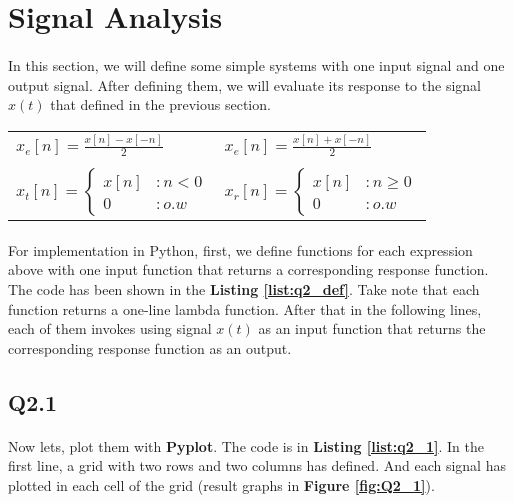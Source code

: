 \section{Signal Analysis}
\paragraph{}In this section, we will define some 
simple systems with one input signal and one output 
signal. After defining them, we will evaluate its 
response to the signal $x(t)$ that defined in the
 previous section.
 \begin{center}
\begin{tabular}{ p{5cm} p{5cm} }
 $x_e[n]=\frac{x[n]-x[-n]}{2}$ & $x_e[n]=\frac{x[n]+x[-n]}{2}$  \\ 
  & \\
 $
  x_t[n] = \begin{cases}
   x[n] &: n < 0\\
   0 &: o.w\end{cases}
 $ & $
  x_r[n] = \begin{cases}
   x[n] &: n\geq 0\\
   0 &: o.w\end{cases}
 $  \\  
 
\end{tabular}
\end{center}
\paragraph{}For implementation in Python, first, we 
define functions for each expression above with one input 
function that returns a corresponding response 
function. The code has been shown in the 
\textbf{Listing \ref{list:q2_def}}. Take note that each function 
returns a one-line lambda function.
After that in the following lines, each 
of them invokes using signal $x(t)$ as an input 
function that returns the corresponding response 
function as an output.


\subsection{Q2.1}
\paragraph{}Now lets, plot them with 
\textbf{Pyplot}. The code is in 
\textbf{Listing \ref{list:q2_1}}. In the first line, 
a grid with two rows and two columns has defined.
 And each signal has plotted in each cell of the grid (result graphs in \textbf{Figure \ref{fig:Q2_1}}).

